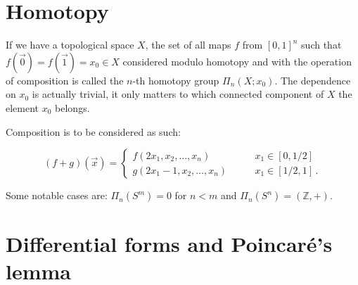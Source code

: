 \documentclass[main.tex]{subfiles}
\begin{document}
\appendix

\section{Homotopy} \label{sec:homotopy}

If we have a topological space \(X\), the set of all maps \(f\) from \([0,1]^n\) such that  \(f(\vec{0}) = f(\vec{1} )=x_0 \in X\) considered modulo homotopy and with the operation of composition is called the \(n\)-th homotopy group \(\Pi_n (X; x_0)\). The dependence on \(x_0\) is actually trivial, it only matters to which connected component of \(X\) the element \(x_0\) belongs.

Composition is to be considered as such:

\begin{equation}
  (f+g) (\vec{x} ) = \begin{cases}
  f(2x_1, x_2, \dots, x_n) \qquad & x_1 \in [0, 1/2 ] \\
  g(2x_1-1, x_2, \dots, x_n) \qquad & x_1 \in [1/2, 1] \,.
  \end{cases}
\end{equation}

Some notable cases are: \(\Pi_n (S^m) = 0 \) for \(n<m\) and \(\Pi_n (S^n) = (\mathbb Z, +)\).


\section{Differential forms and Poincaré's lemma} \label{sec:differential-forms}
\end{document}
